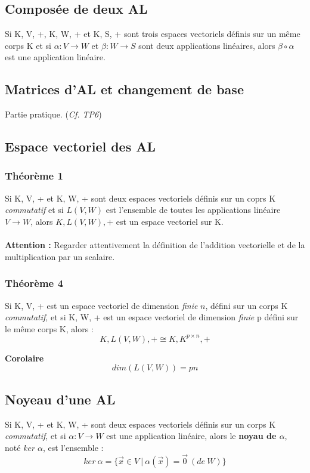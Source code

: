 \documentclass[12pt, a4paper]{article}
\begin{document}
\subsection{Composée de deux AL}
Si K, V, +, K, W, + et K, S, + sont trois espaces vectoriels définis sur un même corps K et si $\alpha : V \rightarrow W$ et $\beta : W \rightarrow S$ sont deux applications linéaires, alors $\beta  \circ  \alpha$ est une application linéaire.

\subsection{Matrices d'AL et changement de base}
Partie pratique. (\textit{Cf. TP6})

\subsection{Espace vectoriel des AL}
\subsubsection{Théorème 1}
Si K, V, + et K, W, + sont deux espaces vectoriels définis sur un coprs K \textit{commutatif} et si $L(V, W)$ est l'ensemble de toutes les applications linéaire $V \rightarrow W$, alors $K, L(V,W), +$ est un espace vectoriel sur K.\\\\
\textbf{Attention :} Regarder attentivement la définition de l'addition vectorielle et de la multiplication par un scalaire.

\subsubsection{Théorème 4}
Si K, V, + est un espace vectoriel de dimension \textit{finie} $n$, défini sur un corps K \textit{commutatif}, et si K, W, + est un espace vectoriel de dimension \textit{finie} p défini sur le même corps K, alors :
$$K, L(V, W), + \cong K, K^{p \times n}, +$$

\textbf{Corolaire}
$$dim(L(V,W)) = pn$$

\subsection{Noyeau d'une AL}
Si K, V, + et K, W, + sont deux espaces vectoriels définis sur un corps K \textit{commutatif}, et si $\alpha : V \rightarrow W$ est une application linéaire, alors le \textbf{noyau de $\alpha$}, noté \textit{ker $\alpha$}, est l'ensemble :
$$ker\ \alpha = \{\vec{x} \in V\ |\ \alpha(\vec{x}) = \vec{0}\ (de\ W)\}$$
\end{document}
